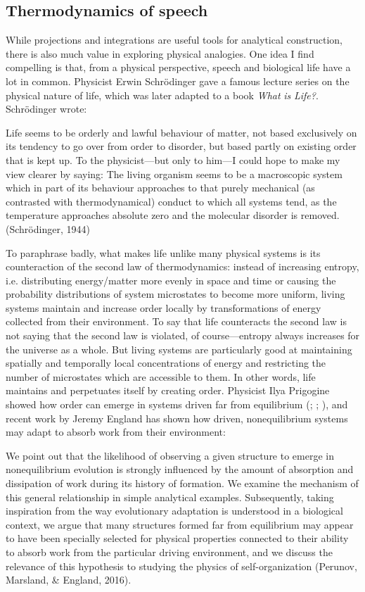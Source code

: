 \subsection{Thermodynamics of speech}

While projections and integrations are useful tools for analytical construction, there is also much value in exploring physical analogies. One idea I find compelling is that, from a physical perspective, speech and biological life have a lot in common. Physicist Erwin Schrödinger gave a famous lecture series on the physical nature of life, which was later adapted to a book \textit{What} \textit{is} \textit{Life?}. Schrödinger wrote:

Life seems to be orderly and lawful behaviour of matter, not based exclusively on its tendency to go over from order to disorder, but based partly on existing order that is kept up. To the physicist—but only to him—I could hope to make my view clearer by saying: The living organism seems to be a macroscopic system which in part of its behaviour approaches to that purely mechanical (as contrasted with thermodynamical) conduct to which all systems tend, as the temperature approaches absolute zero and the molecular disorder is removed. (Schrödinger, 1944)

  To paraphrase badly, what makes life unlike many physical systems is its counteraction of the second law of thermodynamics: instead of increasing entropy, i.e. distributing energy/matter more evenly in space and time or causing the probability distributions of system microstates to become more uniform, living systems maintain and increase order locally by transformations of energy collected from their environment. To say that life counteracts the second law is not saying that the second law is violated, of course—entropy always increases for the universe as a whole. But living systems are particularly good at maintaining spatially and temporally local concentrations of energy and restricting the number of microstates which are accessible to them. In other words, life maintains and perpetuates itself by creating order. Physicist Ilya Prigogine showed how order can emerge in systems driven far from equilibrium (\citealt{KondepudiPrigogine1998}; \citealt{NicolisPrigogine1977}; \citealt{PrigogineStengers1984}), and recent work by Jeremy England has shown how driven, nonequilibrium systems may adapt to absorb work from their environment:

We point out that the likelihood of observing a given structure to emerge in nonequilibrium evolution is strongly influenced by the amount of absorption and dissipation of work during its history of formation. We examine the mechanism of this general relationship in simple analytical examples. Subsequently, taking inspiration from the way evolutionary adaptation is understood in a biological context, we argue that many structures formed far from equilibrium may appear to have been specially selected for physical properties connected to their ability to absorb work from the particular driving environment, and we discuss the relevance of this hypothesis to studying the physics of self-organization (Perunov, Marsland, \& England, 2016).

